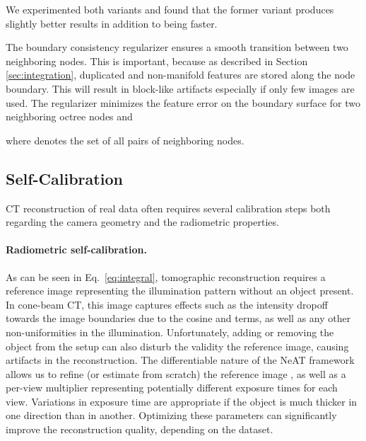 \documentclass[acmtog,nonacm]{acmart} \acmSubmissionID{0438}
\begin{document}
We experimented both variants and found that the former variant
produces slightly better results in addition to being faster.


The boundary consistency regularizer ensures a smooth transition between two neighboring nodes.
This is important, because as described in Section \ref{sec:integration}, duplicated and non-manifold features are stored along the node boundary.
This will result in block-like artifacts especially if only few images are used.
The regularizer minimizes the feature error on the boundary surface  for two neighboring octree nodes  and 

where  denotes the set of all pairs of neighboring nodes.


\subsection{Self-Calibration}
\label{sec:self_calibration}

CT reconstruction of real data often requires several calibration
steps both regarding the camera geometry and the radiometric
properties. 

\paragraph*{Radiometric self-calibration.}
As can be seen in Eq.~\eqref{eq:integral}, tomographic reconstruction
requires a reference image  representing the illumination
pattern without an object present. In cone-beam CT, this image
captures effects such as the intensity dropoff towards the image
boundaries due to the cosine and  terms, as well as any other
non-uniformities in the illumination. Unfortunately, adding or
removing the object from the setup can also disturb the validity the
reference image, causing artifacts in the reconstruction. The
differentiable nature of the NeAT framework allows us to refine (or
estimate from scratch) the reference image , as well as a
per-view multiplier representing potentially different exposure times
for each view. Variations in exposure time are appropriate if the
object is much thicker in one direction than in another. Optimizing
these parameters can significantly improve the reconstruction quality,
depending on the dataset.
\end{document}
